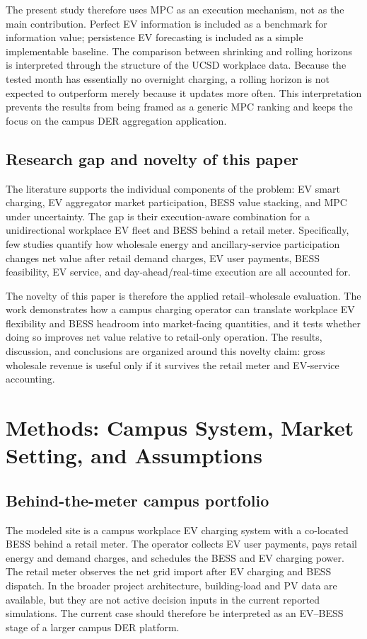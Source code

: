 \documentclass[final,5p,times]{elsarticle}
\begin{document}
The present study therefore uses MPC as an execution mechanism, not as the main contribution. Perfect EV information is included as a benchmark for information value; persistence EV forecasting is included as a simple implementable baseline. The comparison between shrinking and rolling horizons is interpreted through the structure of the UCSD workplace data. Because the tested month has essentially no overnight charging, a rolling horizon is not expected to outperform merely because it updates more often. This interpretation prevents the results from being framed as a generic MPC ranking and keeps the focus on the campus DER aggregation application.

\subsection{Research gap and novelty of this paper}
The literature supports the individual components of the problem: EV smart charging, EV aggregator market participation, BESS value stacking, and MPC under uncertainty. The gap is their execution-aware combination for a unidirectional workplace EV fleet and BESS behind a retail meter. Specifically, few studies quantify how wholesale energy and ancillary-service participation changes net value after retail demand charges, EV user payments, BESS feasibility, EV service, and day-ahead/real-time execution are all accounted for.

The novelty of this paper is therefore the applied retail--wholesale evaluation. The work demonstrates how a campus charging operator can translate workplace EV flexibility and BESS headroom into market-facing quantities, and it tests whether doing so improves net value relative to retail-only operation. The results, discussion, and conclusions are organized around this novelty claim: gross wholesale revenue is useful only if it survives the retail meter and EV-service accounting.

\section{Methods: Campus System, Market Setting, and Assumptions}
\label{sec:system_description}

\subsection{Behind-the-meter campus portfolio}
The modeled site is a campus workplace EV charging system with a co-located BESS behind a retail meter. The operator collects EV user payments, pays retail energy and demand charges, and schedules the BESS and EV charging power. The retail meter observes the net grid import after EV charging and BESS dispatch. In the broader project architecture, building-load and PV data are available, but they are not active decision inputs in the current reported simulations. The current case should therefore be interpreted as an EV--BESS stage of a larger campus DER platform.
\end{document}
